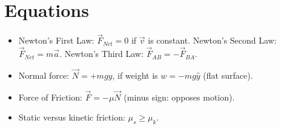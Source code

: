 \documentclass[10pt]{article}
\begin{document}
\maketitle

\section{Equations}
\begin{itemize}
\item Newton's First Law: $\vec{F}_{Net} = 0$ if $\vec{v}$ is constant.  Newton's Second Law: $\vec{F}_{Net} = m \vec{a}$. Newton's Third Law: $\vec{F}_{AB} = -\vec{F}_{BA}$.
\item Normal force: $\vec{N} = +mg\hat{y}$, if weight is $w = -mg\hat{y}$ (flat surface).
\item Force of Friction: $\vec{F} = -\mu \vec{N}$ (minus sign: opposes motion).
\item Static versus kinetic friction: $\mu_s \geq \mu_k$.
\end{itemize}
\end{document}
